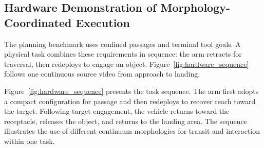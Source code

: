 
\subsection{Hardware Demonstration of Morphology-Coordinated Execution}
\label{sec:hardware}
The planning benchmark uses confined passages and terminal tool goals. A physical task combines these requirements in sequence: the arm retracts for traversal, then redeploys to engage an object. Figure~\ref{fig:hardware_sequence} follows one continuous source video from approach to landing.



Figure~\ref{fig:hardware_sequence} presents the task sequence. The arm first adopts a compact configuration for passage and then redeploys to recover reach toward the target. Following target engagement, the vehicle returns toward the receptacle, releases the object, and returns to the landing area. The sequence illustrates the use of different continuum morphologies for transit and interaction within one task.
